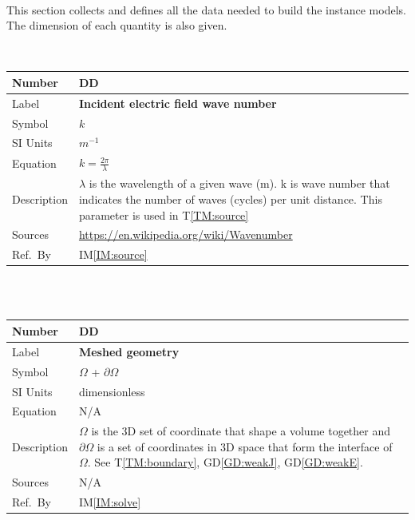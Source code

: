 \documentclass[12pt]{article}
\newcommand{\colBwidth}{0.82\textwidth} \newcommand{\colCwidth}{0.1\textwidth}
\newcounter{defnum} %
\newcounter{datadefnum} %
\begin{document}
	\
	
	This section collects and defines all the data needed to build the instance
	models. The dimension of each quantity is also given.
	
	
	~\newline
	
	\noindent \begin{minipage}{\textwidth} \renewcommand*{\arraystretch}{1.5}
		\begin{tabular}{| p{\colAwidth} | p{\colBwidth}|} \hline \rowcolor[gray]{0.9}
			Number& DD{datadefnum}\thedatadefnum \label{DD:wavenumber}\\
			\hline Label& \bf Incident electric field wave number\\ \hline Symbol &$k$\\
			\hline %
			SI Units & $m^{-1}$\\ \hline Equation&$k=\frac{2\pi}{\lambda}$\\ \hline
			Description & $\lambda$ is the wavelength of a given wave (m). k is wave
			number that indicates the  number of waves (cycles) per unit distance. This parameter is used in T\ref{TM:source} \\
			\hline Sources& \url{https://en.wikipedia.org/wiki/Wavenumber} \\ \hline Ref.\
			By & IM\ref{IM:source} \\ \hline \end{tabular}
	\end{minipage}\\
	
	
	
	~\newline
	
	\noindent \begin{minipage}{\textwidth} \renewcommand*{\arraystretch}{1.5}
		\begin{tabular}{| p{\colAwidth} | p{\colBwidth}|} \hline \rowcolor[gray]{0.9}
			Number& DD{datadefnum}\thedatadefnum \label{DD:omega}\\ \hline
			Label& \bf Meshed geometry \\ \hline Symbol &$\Omega$ + $\partial \Omega$\\
			\hline %
			SI Units &dimensionless\\ \hline Equation& N/A \\ \hline Description &
			$\Omega$ is the 3D set of coordinate that shape a volume together and
			$\partial \Omega$ is a set of coordinates in 3D space that form the interface
			of $\Omega$. See 	T\ref{TM:boundary}, GD\ref{GD:weakJ}, GD\ref{GD:weakE}. \\ \hline Sources& N/A\\ \hline Ref.\ By & IM\ref{IM:solve}
		 \\ \hline \end{tabular}
	\end{minipage}\\
	
\end{document}
